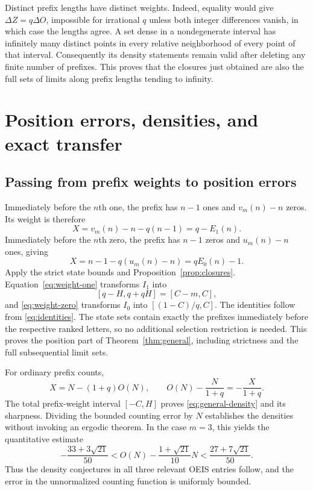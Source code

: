 \documentclass[11pt]{article}
\numberwithin{equation}{section}
\theoremstyle{definition}
\theoremstyle{remark}
\begin{document}
Distinct prefix lengths have distinct weights. Indeed, equality would
give $\Delta Z=q\Delta O$, impossible for irrational $q$ unless both
integer differences vanish, in which case the lengths agree. A set dense
in a nondegenerate interval has infinitely many distinct points in every
relative neighborhood of every point of that interval. Consequently its
density statements remain valid after deleting any finite number of
prefixes. This proves that the closures just obtained are also the full
sets of limits along prefix lengths tending to infinity.

\section{Position errors, densities, and exact transfer}\label{sec:positions}

\subsection{Passing from prefix weights to position errors}
Immediately before the $n$th one, the prefix has $n-1$ ones and
$v_m(n)-n$ zeros. Its weight is therefore
\begin{equation}\label{eq:weight-one}
X=v_m(n)-n-q(n-1)=q-E_1(n).
\end{equation}
Immediately before the $n$th zero, the prefix has $n-1$ zeros and
$u_m(n)-n$ ones, giving
\begin{equation}\label{eq:weight-zero}
X=n-1-q(u_m(n)-n)=qE_0(n)-1.
\end{equation}
Apply the strict state bounds and Proposition~\ref{prop:closures}.
Equation~\eqref{eq:weight-one} transforms $I_1$ into
\[
[q-H,q+qH]=[C-m,C],
\]
and \eqref{eq:weight-zero} transforms $I_0$ into
$[(1-C)/q,C]$. The identities follow from \eqref{eq:identities}.
The state sets contain exactly the prefixes immediately before the
respective ranked letters, so no additional selection restriction is
needed. This proves the position part of Theorem~\ref{thm:general},
including strictness and the full subsequential limit sets.

For ordinary prefix counts,
\begin{equation}\label{eq:count-weight}
X=N-(1+q)O(N),\qquad
O(N)-\frac{N}{1+q}=-\frac{X}{1+q}.
\end{equation}
The total prefix-weight interval $[-C,H]$ proves
\eqref{eq:general-density} and its sharpness. Dividing the bounded
counting error by $N$ establishes the densities without invoking an
ergodic theorem. In the case $m=3$, this yields the quantitative estimate
\begin{equation}\label{eq:density3}
-\frac{33+3\sqrt{21}}{50}
<O(N)-\frac{1+\sqrt{21}}{10}N
<\frac{27+7\sqrt{21}}{50}.
\end{equation}
Thus the density conjectures in all three relevant OEIS entries follow,
and the error in the unnormalized counting function is uniformly bounded.
\end{document}
